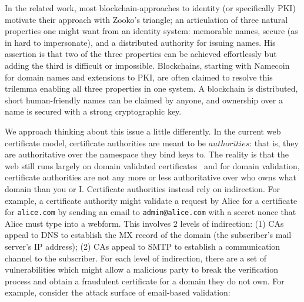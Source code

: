 In the related work, most blockchain-approaches to identity (or specifically PKI) motivate their approach with Zooko's triangle; an articulation of three natural properties one might want from an identity system: memorable names, secure (as in hard to impersonate), and a distributed authority for issuing names. His assertion is that two of the three properties can be achieved effortlessly but adding the third is difficult or impossible. Blockchains, starting with Namecoin for domain names and extensions to PKI, are often claimed to resolve this trilemma enabling all three properties in one system. A blockchain is  distributed, short human-friendly names can be claimed by anyone, and ownership over a name is secured with a strong cryptographic key. 

We approach thinking about this issue a little differently. In the current web certificate model, certificate authorities are meant to be $authorities$: that is, they are authoritative over the namespace they bind keys to. The reality is that the web still runs largely on domain validated certificates~\cite{DKBH13,HBKC11} and for domain validation, certificate authorities are not any more or less authoritative over who owns what domain than you or I. Certificate authorities instead rely on indirection. For example, a certificate authority might validate a request by Alice for a certificate for \texttt{alice.com} by sending an email to \texttt{admin@alice.com} with a secret nonce that Alice must type into a webform. This involves 2 levels of indirection: (1) CAs appeal to DNS to establish the MX record of the domain (\ie the subscriber's mail server's IP address); (2) CAs appeal to SMTP to establish a communication channel to the subscriber. For each level of indirection, there are a set of vulnerabilities which might allow a malicious party to break the verification process and obtain a fraudulent certificate for a domain they do not own. For example, consider the attack surface of email-based validation:

